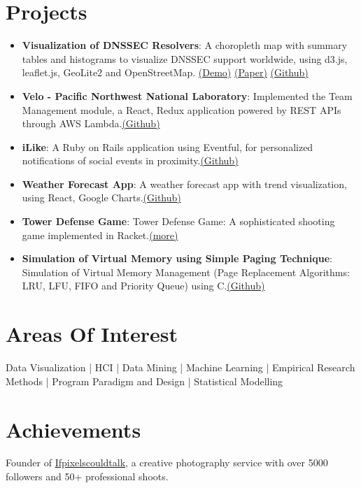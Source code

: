 \documentclass[letterpaper,11pt]{article}
\newcommand{\resumeItem}[2]{
  \item\small{
    \textbf{#1}{: #2 \vspace{-2pt}}
  }
}
\newcommand{\resumeSubItem}[2]{\resumeItem{#1}{#2}\vspace{-4pt}}
\newcommand{\resumeSubHeadingListStart}{\begin{itemize}[leftmargin=*]}
\newcommand{\resumeSubHeadingListEnd}{\end{itemize}}
\begin{document}
\section{Projects}
  \resumeSubHeadingListStart 
    \resumeSubItem{Visualization of DNSSEC Resolvers}
      {A choropleth map with summary tables and histograms to visualize DNSSEC support worldwide, using d3.js, leaflet.js, GeoLite2 and OpenStreetMap. \href{http://ec2-13-59-150-114.us-east-2.compute.amazonaws.com:3000/} {(Demo)} \href{https://drive.google.com/drive/folders/1Oc6g4fNo4LQgKQe8uxul2HIDKMQ-hzQZ/} {(Paper)} \href{https://github.com/shivachaturvedi/dnssec-viz} {(Github)}}
    \resumeSubItem{Velo - Pacific Northwest National Laboratory}
      {Implemented the Team Management module, a React, Redux application powered by REST APIs through AWS Lambda.\href{https://github.com/VeloCloud/website-ui}{(Github)}}
    \resumeSubItem{iLike}
      {A Ruby on Rails application using Eventful, for personalized notifications of social events in proximity.\href{https://github.com/shivachaturvedi/iLike}{(Github)}}
    \resumeSubItem{Weather Forecast App}
      {A weather forecast app with trend visualization, using React, Google Charts.\href{https://github.com/shivachaturvedi/ReduxWeatherForecast}{(Github)}}
    \resumeSubItem{Tower Defense Game}
      {Tower Defense Game: A sophisticated shooting game implemented in Racket.\href{https://course.ccs.neu.edu/cs5010sp15/set13.html}{(more)}}
    \resumeSubItem{Simulation of Virtual Memory using Simple Paging Technique}
      {Simulation of Virtual Memory Management (Page Replacement Algorithms: LRU, LFU, FIFO and Priority Queue) using C.\href{https://github.com/shivachaturvedi/VirtualMemorySimulation}{(Github)}}
  \resumeSubHeadingListEnd

%

\section{Areas Of Interest}
{Data Visualization | HCI | Data Mining | Machine Learning | Empirical Research Methods | Program Paradigm and Design | Statistical Modelling}
\section{Achievements}
{Founder of \href{https://facebook.com/ifpixelscouldtalk}{Ifpixelscouldtalk}, a creative photography service with over 5000 followers and 50+ professional shoots.}
\end{document}
